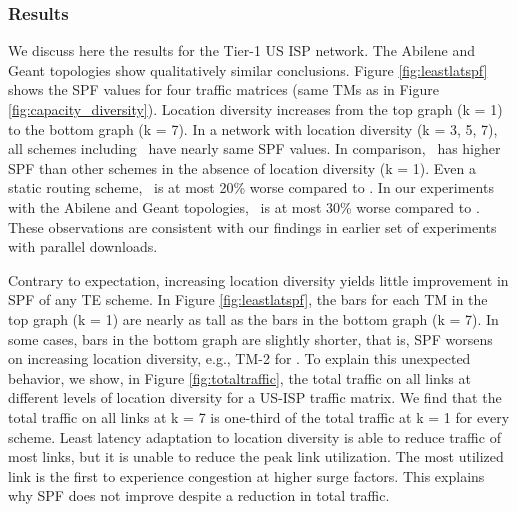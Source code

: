 \subsubsection{Results}


We discuss here the results for the Tier-1 US ISP network. 
The Abilene and Geant topologies show qualitatively similar conclusions.
Figure \ref{fig:leastlatspf} shows the SPF values for four traffic matrices (same TMs as in Figure \ref{fig:capacity_diversity}). 
Location diversity increases from the top  graph (k = 1)  to the bottom graph (k = 7).
In a network with location diversity  (k = 3, 5, 7), all schemes including \opt\ have nearly same SPF values.
In comparison, \opt\ has higher SPF than other schemes in the absence of location diversity (k = 1). 
Even a static routing scheme, \invcap\ is at most 20\% worse compared to \opt.
In our experiments with the Abilene and Geant topologies, \invcap\ is at most 30\% worse compared to \opt. 
These observations are consistent with our findings in earlier set of experiments with parallel downloads.




Contrary to expectation, increasing location diversity yields little improvement in SPF of any TE scheme.
In Figure \ref{fig:leastlatspf}, the bars for each TM in the top graph (k = 1) are nearly as  tall as the bars in the bottom graph (k = 7). 
In some cases, bars in the bottom graph are slightly shorter, that is, SPF worsens on increasing location diversity, e.g.,  TM-2 for \opt.
To explain this unexpected behavior, we show, in Figure \ref{fig:totaltraffic}, the total traffic on all links at different levels of location diversity for a US-ISP traffic matrix.
We find that the total traffic on all links at k = 7 is one-third of the total traffic at k = 1 for every scheme.
Least latency adaptation to location diversity is able to reduce traffic of most links, but it is unable to reduce the peak link utilization.
The most utilized link is the first to experience congestion at higher surge factors.
This explains why SPF does not improve despite a reduction in total traffic.


